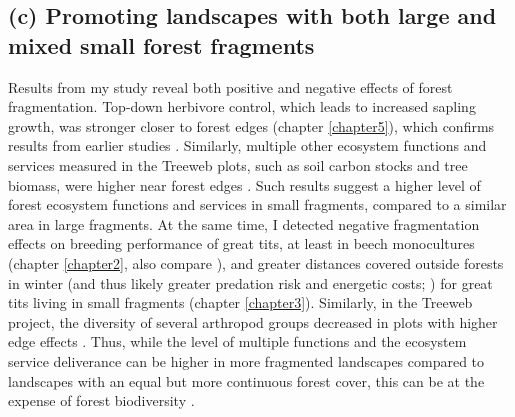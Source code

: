 \documentclass[10pt, twoside]{book} %
\begin{document}
	\subsection*{(c) Promoting landscapes with both large and mixed small forest fragments}
	Results from my study reveal both positive and negative effects of forest fragmentation. Top-down herbivore control, which leads to increased sapling growth, was stronger closer to forest edges (chapter \ref{chapter5}), which confirms results from earlier studies \citep{Gonzalez-Gomez2006, Barbaro2014}. Similarly, multiple other ecosystem functions and services measured in the Treeweb plots, such as soil carbon stocks and tree biomass, were higher near forest edges \citep{Hertzog2019}. Such results suggest a higher level of forest ecosystem functions and services in small fragments, compared to a similar area in large fragments. At the same time, I detected negative fragmentation effects on breeding performance of great tits, at least in beech monocultures (chapter \ref{chapter2}, also compare \citealt{Wilkin2007, Bueno-Enciso2016}), and greater distances covered outside forests in winter (and thus likely greater predation risk and energetic costs; \citealt{Lima1990, Hinsley2000}) for great tits living in small fragments (chapter \ref{chapter3}). Similarly, in the Treeweb project, the diversity of several arthropod groups decreased in plots with higher edge effects \citep{Hertzog2020}. Thus, while the level of multiple functions and the ecosystem service deliverance can be higher in more fragmented landscapes compared to landscapes with an equal but more continuous forest cover, this can be at the expense of forest biodiversity \citep{Hertzog2020, Valdes2020}.\\
	
\end{document}
